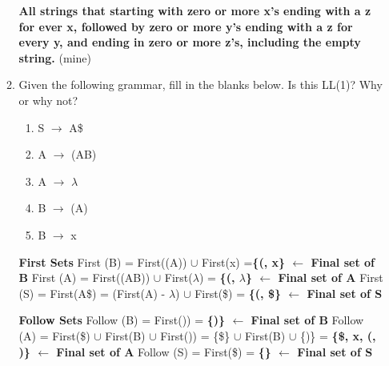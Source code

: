 \documentclass{report}
\begin{document}
\begin{enumerate}
\begin{enumerate}
    \textbf{All strings that starting with zero or more x's ending with a z for ever x, followed by zero or more y's ending with a z for every y, and ending in zero or more z's, including the empty string.} (mine)
\newpage
    \item Given the following grammar, fill in the blanks below. Is this LL(1)? Why or why not?
    \begin{multicols}{2}
      \begin{enumerate}[label=\arabic*.]
        \item S $\rightarrow$ A\$
        \item A $\rightarrow$ (AB)
        \item A $\rightarrow$ $\lambda$
        \item B $\rightarrow$ (A)
        \item B $\rightarrow$ x\newline
      \end{enumerate}
\setlength{\leftskip}{-12em}
      \textbf{First Sets}\newline
      First (B) = First((A)) $\cup$ First(x) =\textbf{\{(, x\} $\leftarrow$ Final set of B}\newline
      First (A) = First((AB)) $\cup$ First($\lambda$) = \textbf{\{(, $\lambda$\} $\leftarrow$ Final set of A}\newline
      First (S) = First(A\$)\newline
      \indent\hspace{1.5cm}= (First(A) - $\lambda$) $\cup$ First(\$) = \textbf{\{(, \$\} $\leftarrow$ Final set of S}\newline
    \end{multicols}
    \vspace{-1em}
    \textbf{Follow Sets}\newline
    Follow (B) = First()) = \textbf{ \{)\} $\leftarrow$ Final set of B}\newline
    Follow (A) = First(\$) $\cup$ First(B) $\cup$ First())\newline
    \indent\hspace{1.75cm}= \{\$\} $\cup$ First(B) $\cup$ \{)\}\newline
    \indent\hspace{1.75cm}= \textbf{ \{\$, x, (, )\} $\leftarrow$ Final set of A}\newline
    Follow (S) = First(\$) = \textbf{ \{\} $\leftarrow$ Final set of S}\newline


\end{enumerate}
\end{enumerate}
\end{document}
